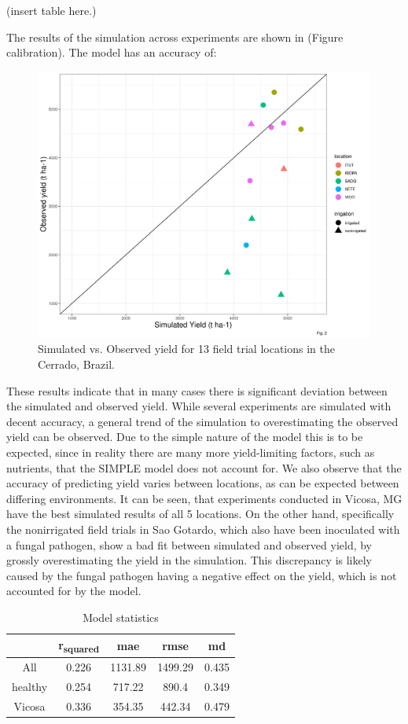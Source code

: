 \documentclass[11pt]{article}
\begin{document}
(insert table here.)

The results of the simulation across experiments are shown in (Figure calibration). The model has an accuracy of:

\begin{figure}[htbp]
\centering
\includegraphics[width=.9\linewidth]{../results/experimental-data/2023-02-18_Obs_Sim_all_415.png}
\caption{Simulated vs. Observed yield for 13 field trial locations in the Cerrado, Brazil.}
\end{figure}

These results indicate that in many cases there is significant deviation between the simulated and observed yield. While several experiments are simulated with decent accuracy, a general trend of the simulation to overestimating the observed yield can be observed. Due to the simple nature of the model this is to be expected, since in reality there are many more yield-limiting factors, such as nutrients, that the SIMPLE model does not account for.
We also observe that the accuracy of predicting yield varies between locations, as can  be expected between differing environments. It can be seen, that experiments conducted in Vicosa, MG have the best simulated results of all 5 locations. On the other hand, specifically the nonirrigated field trials in Sao Gotardo, which also have been inoculated with a fungal pathogen, show a bad fit between simulated and observed yield, by grossly overestimating the yield in the simulation. This discrepancy is likely caused by the fungal pathogen having a negative effect on the yield, which is not accounted for by the model.

\begin{table}[htbp]
\caption{\label{stats}Model statistics}
\centering
\begin{tabular}{|c|c|c|c|c|}
\hline
 & r\textsubscript{squared} & mae & rmse & md\\
\hline
All & 0.226 & 1131.89 & 1499.29 & 0.435\\
healthy & 0.254 & 717.22 & 890.4 & 0.349\\
Vicosa & 0.336 & 354.35 & 442.34 & 0.479\\
\hline
\end{tabular}
\end{table}
\end{document}
